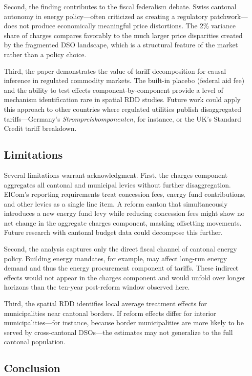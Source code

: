 \documentclass[12pt]{article}
\begin{document}
Second, the finding contributes to the fiscal federalism debate. Swiss cantonal autonomy in energy policy---often criticized as creating a regulatory patchwork---does not produce economically meaningful price distortions. The 2\% variance share of charges compares favorably to the much larger price disparities created by the fragmented DSO landscape, which is a structural feature of the market rather than a policy choice.

Third, the paper demonstrates the value of tariff decomposition for causal inference in regulated commodity markets. The built-in placebo (federal aid fee) and the ability to test effects component-by-component provide a level of mechanism identification rare in spatial RDD studies. Future work could apply this approach to other countries where regulated utilities publish disaggregated tariffs---Germany's \textit{Strompreiskomponenten}, for instance, or the UK's Standard Credit tariff breakdown.

\subsection{Limitations}

Several limitations warrant acknowledgment. First, the charges component aggregates all cantonal and municipal levies without further disaggregation. ElCom's reporting requirements treat concession fees, energy fund contributions, and other levies as a single line item. A reform canton that simultaneously introduces a new energy fund levy while reducing concession fees might show no net change in the aggregate charges component, masking offsetting movements. Future research with cantonal budget data could decompose this further.

Second, the analysis captures only the direct fiscal channel of cantonal energy policy. Building energy mandates, for example, may affect long-run energy demand and thus the energy procurement component of tariffs. These indirect effects would not appear in the charges component and would unfold over longer horizons than the ten-year post-reform window observed here.

Third, the spatial RDD identifies local average treatment effects for municipalities near cantonal borders. If reform effects differ for interior municipalities---for instance, because border municipalities are more likely to be served by cross-cantonal DSOs---the estimates may not generalize to the full cantonal population.

\subsection{Conclusion}
\end{document}
